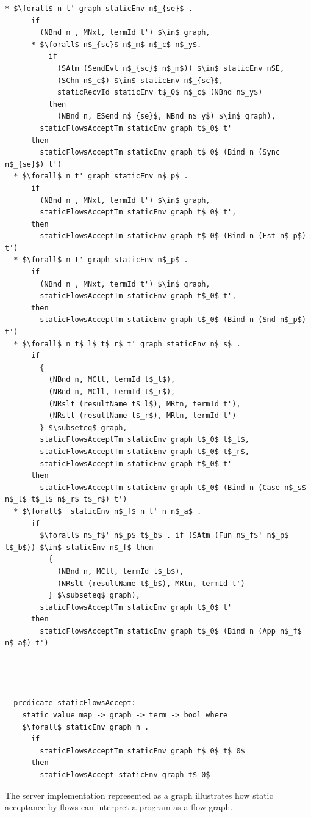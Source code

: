 \documentclass[letterpaper, 11pt]{extarticle}
\begin{document}
\begin{lstlisting}[language=logic, mathescape]
  * $\forall$ n t' graph staticEnv n$_{se}$ .
      if
        (NBnd n , MNxt, termId t') $\in$ graph,
      * $\forall$ n$_{sc}$ n$_m$ n$_c$ n$_y$.
          if
            (SAtm (SendEvt n$_{sc}$ n$_m$)) $\in$ staticEnv nSE, 
            (SChn n$_c$) $\in$ staticEnv n$_{sc}$,
            staticRecvId staticEnv t$_0$ n$_c$ (NBnd n$_y$)
          then
            (NBnd n, ESend n$_{se}$, NBnd n$_y$) $\in$ graph),
        staticFlowsAcceptTm staticEnv graph t$_0$ t'
      then
        staticFlowsAcceptTm staticEnv graph t$_0$ (Bind n (Sync n$_{se}$) t')
  * $\forall$ n t' graph staticEnv n$_p$ .
      if
        (NBnd n , MNxt, termId t') $\in$ graph,
        staticFlowsAcceptTm staticEnv graph t$_0$ t',
      then
        staticFlowsAcceptTm staticEnv graph t$_0$ (Bind n (Fst n$_p$) t')
  * $\forall$ n t' graph staticEnv n$_p$ .
      if
        (NBnd n , MNxt, termId t') $\in$ graph,
        staticFlowsAcceptTm staticEnv graph t$_0$ t',
      then
        staticFlowsAcceptTm staticEnv graph t$_0$ (Bind n (Snd n$_p$) t')
  * $\forall$ n t$_l$ t$_r$ t' graph staticEnv n$_s$ .
      if
        {
          (NBnd n, MCll, termId t$_l$),
          (NBnd n, MCll, termId t$_r$),
          (NRslt (resultName t$_l$), MRtn, termId t'),
          (NRslt (resultName t$_r$), MRtn, termId t')
        } $\subseteq$ graph,
        staticFlowsAcceptTm staticEnv graph t$_0$ t$_l$,
        staticFlowsAcceptTm staticEnv graph t$_0$ t$_r$,
        staticFlowsAcceptTm staticEnv graph t$_0$ t'
      then
        staticFlowsAcceptTm staticEnv graph t$_0$ (Bind n (Case n$_s$ n$_l$ t$_l$ n$_r$ t$_r$) t')
  * $\forall$  staticEnv n$_f$ n t' n n$_a$ .
      if
        $\forall$ n$_f$' n$_p$ t$_b$ . if (SAtm (Fun n$_f$' n$_p$ t$_b$)) $\in$ staticEnv n$_f$ then 
          {
            (NBnd n, MCll, termId t$_b$),
            (NRslt (resultName t$_b$), MRtn, termId t')
          } $\subseteq$ graph),
        staticFlowsAcceptTm staticEnv graph t$_0$ t'
      then
        staticFlowsAcceptTm staticEnv graph t$_0$ (Bind n (App n$_f$ n$_a$) t')




  predicate staticFlowsAccept:
    static_value_map -> graph -> term -> bool where
    $\forall$ staticEnv graph n .
      if
        staticFlowsAcceptTm staticEnv graph t$_0$ t$_0$
      then
        staticFlowsAccept staticEnv graph t$_0$ 

\end{lstlisting}

The server implementation represented as a graph illustrates how static acceptance by
flows can interpret a program as a flow graph.
\end{document}
